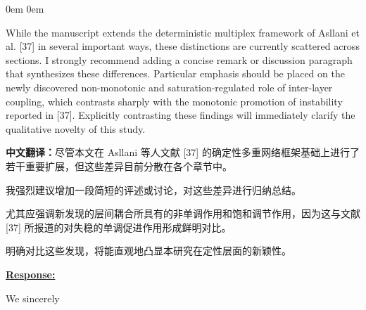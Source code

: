 \documentclass[a4paper,12pt]{article}
\newcommand{\zhtranslationfirst}[1]{%
    \par\medskip\noindent
    {\small\color{blue!60!black}\textbf{中文翻译：}#1}\par
}
\newcommand{\zhtranslation}[1]{%
    \par\smallskip\noindent
    {\small\color{blue!60!black}#1}\par
}
\begin{document}
\leftskip 0em
\rightskip 0em
\medskip


\newpage
\begin{tcolorbox}[title = {Comment 2},fonttitle = \bfseries]
    While the manuscript extends the deterministic multiplex framework of Asllani et al. [37] in several important ways, these distinctions are currently scattered across sections. I strongly recommend adding a concise remark or discussion paragraph that synthesizes these differences. Particular emphasis should be placed on the newly discovered non-monotonic and saturation-regulated role of inter-layer coupling, which contrasts sharply with the monotonic promotion of instability reported in [37]. Explicitly contrasting these findings will immediately clarify the qualitative novelty of this study.
    \zhtranslationfirst{尽管本文在 Asllani 等人文献 [37] 的确定性多重网络框架基础上进行了若干重要扩展，但这些差异目前分散在各个章节中。}
    \zhtranslation{我强烈建议增加一段简短的评述或讨论，对这些差异进行归纳总结。}
    \zhtranslation{尤其应强调新发现的层间耦合所具有的非单调作用和饱和调节作用，因为这与文献 [37] 所报道的对失稳的单调促进作用形成鲜明对比。}
    \zhtranslation{明确对比这些发现，将能直观地凸显本研究在定性层面的新颖性。}
\end{tcolorbox}

\noindent \underline {\textbf{Response:}}
\bigskip

We sincerely

\end{document}
